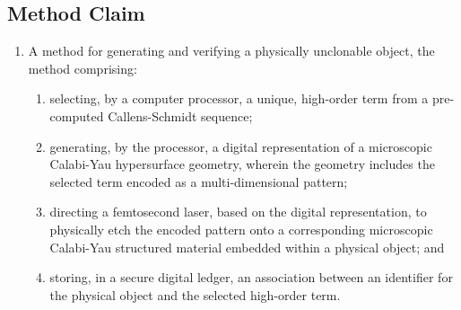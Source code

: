 \documentclass{article}
\begin{document}
\subsection{Method Claim}
\begin{enumerate}
    \item[1.] A method for generating and verifying a physically unclonable object, the method comprising:
    \begin{enumerate}
        \item[(a)] selecting, by a computer processor, a unique, high-order term from a pre-computed Callens-Schmidt sequence;
        \item[(b)] generating, by the processor, a digital representation of a microscopic Calabi-Yau hypersurface geometry, wherein the geometry includes the selected term encoded as a multi-dimensional pattern;
        \item[(c)] directing a femtosecond laser, based on the digital representation, to physically etch the encoded pattern onto a corresponding microscopic Calabi-Yau structured material embedded within a physical object; and
        \item[(d)] storing, in a secure digital ledger, an association between an identifier for the physical object and the selected high-order term.
\end{enumerate}

\end{enumerate}
\end{document}
